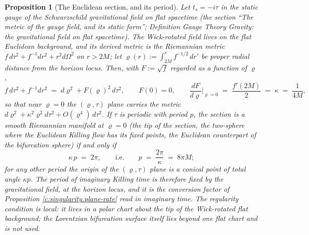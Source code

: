 \documentclass[11pt]{article}
\newtheorem{proposition}[theorem]{Proposition}
\theoremstyle{definition}
\theoremstyle{plain}
\newcommand{\changedmark}[2]{\marginpar{\raggedright\scriptsize\color{#1}#2}}
\begin{document}
\begin{proposition}[The Euclidean section, and its period]\label{c:singularity.euclidean-section-period}
\changedmark{BurntOrange}{changed since the deposit}
Let $t_s = -i\tau$ in the static gauge of the Schwarzschild gravitational field on flat spacetime (the section ``The metric of the gauge field, and its static form''; Definition \emph{Gauge Theory Gravity: the gravitational field on flat spacetime}). The Wick-rotated field lives on the flat Euclidean background, and its derived metric is the Riemannian metric $f\,d\tau^{2} + f^{-1}dr^{2} + r^{2}d\Omega^{2}$ on $r > 2M$; let $\varrho(r) := \int_{2M}^{r} f^{-1/2}\,dr'$ be proper radial distance from the horizon locus. Then, with $F := \sqrt f$ regarded as a function of $\varrho$,
\[
f\,d\tau^{2} + f^{-1}dr^{2} \;=\; d\varrho^{2} + F(\varrho)^{2}\,d\tau^{2}, \qquad F(0) = 0, \qquad \frac{dF}{d\varrho}\Big|_{\varrho = 0} \;=\; \frac{f'(2M)}{2} \;=\; \kappa \;=\; \frac{1}{4M} ,
\]
so that near $\varrho = 0$ the $(\varrho, \tau)$ plane carries the metric $d\varrho^{2} + \kappa^{2}\varrho^{2}d\tau^{2} + O(\varrho^{4})\,d\tau^{2}$. If $\tau$ is periodic with period $p$, the section is a smooth Riemannian manifold at $\varrho = 0$ (the tip of the section, the two-sphere where the Euclidean Killing flow has its fixed points, the Euclidean counterpart of the bifurcation sphere) if and only if
\[
\kappa\,p \;=\; 2\pi, \qquad \text{i.e.} \qquad p \;=\; \frac{2\pi}{\kappa} \;=\; 8\pi M ;
\]
for any other period the origin of the $(\varrho, \tau)$ plane is a conical point of total angle $\kappa p$. The period of imaginary Killing time is therefore fixed by the gravitational field, at the horizon locus, and it is the conversion factor of Proposition \ref{c:singularity.plane-rate} read in imaginary time. The regularity condition is local: it lives in a polar chart about the tip of the Wick-rotated flat background; the Lorentzian bifurcation surface itself lies beyond one flat chart and is not used.
\end{proposition}
\end{document}

